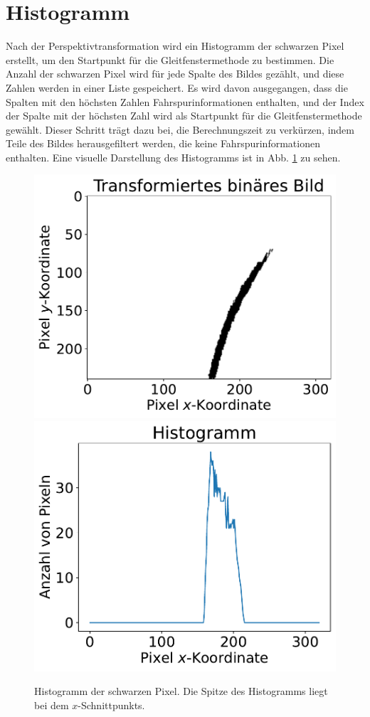 \documentclass[arbeit=studie,oneside,BCOR=12mm]{ArbeitRST}
\begin{document}
\section{Histogramm}

Nach der Perspektivtransformation wird ein Histogramm der schwarzen Pixel erstellt,
um den Startpunkt für die Gleitfenstermethode zu bestimmen. Die Anzahl der
schwarzen Pixel wird für jede Spalte des Bildes gezählt, und diese Zahlen werden
in einer Liste gespeichert. Es wird davon ausgegangen, dass die Spalten mit den
höchsten Zahlen Fahrspurinformationen enthalten, und der Index der Spalte mit
der höchsten Zahl wird als Startpunkt für die Gleitfenstermethode gewählt.
Dieser Schritt trägt dazu bei, die Berechnungszeit zu verkürzen, indem Teile
des Bildes herausgefiltert werden, die keine Fahrspurinformationen enthalten.
Eine visuelle Darstellung des Histogramms ist in Abb. \ref{hist} zu sehen. \\

\begin{figure}[h]
    \centering
    \includegraphics[scale=0.47]{hist1}
    \includegraphics[scale=0.47]{hist2}
    \caption{Histogramm der schwarzen Pixel. Die Spitze des Histogramms liegt bei dem
    $x$-Schnittpunkts.}
    \label{hist}
\end{figure}
\end{document}
